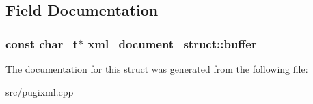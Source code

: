 \subsection{Field Documentation}
\hypertarget{structxml__document__struct_a120451f29b8cc2a82a3ecc926449ea0e}{
\subsubsection[{buffer}]{\setlength{\rightskip}{0pt plus 5cm}const char\_\-t$\ast$ {\bf xml\_\-document\_\-struct::buffer}}}
\label{structxml__document__struct_a120451f29b8cc2a82a3ecc926449ea0e}


The documentation for this struct was generated from the following file:\begin{DoxyCompactItemize}
\item 
src/\hyperlink{pugixml_8cpp}{pugixml.cpp}\end{DoxyCompactItemize}
